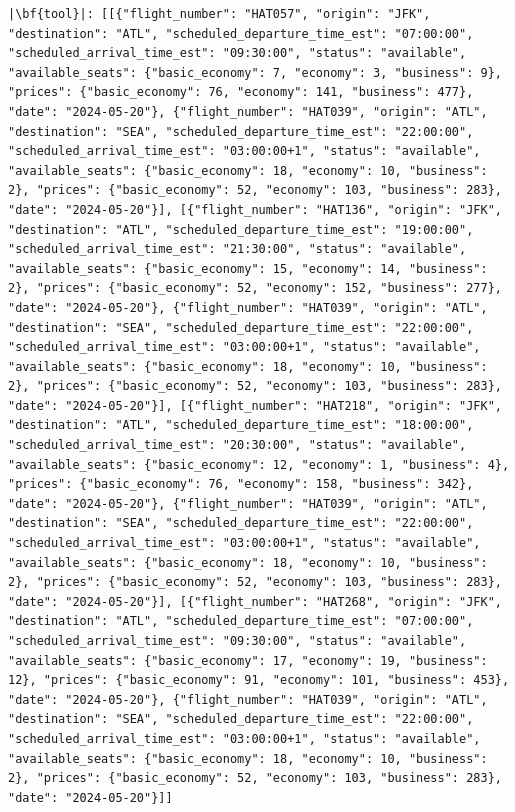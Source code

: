 \begin{verbatim}
|\bf{tool}|: [[{"flight_number": "HAT057", "origin": "JFK", "destination": "ATL", "scheduled_departure_time_est": "07:00:00", "scheduled_arrival_time_est": "09:30:00", "status": "available", "available_seats": {"basic_economy": 7, "economy": 3, "business": 9}, "prices": {"basic_economy": 76, "economy": 141, "business": 477}, "date": "2024-05-20"}, {"flight_number": "HAT039", "origin": "ATL", "destination": "SEA", "scheduled_departure_time_est": "22:00:00", "scheduled_arrival_time_est": "03:00:00+1", "status": "available", "available_seats": {"basic_economy": 18, "economy": 10, "business": 2}, "prices": {"basic_economy": 52, "economy": 103, "business": 283}, "date": "2024-05-20"}], [{"flight_number": "HAT136", "origin": "JFK", "destination": "ATL", "scheduled_departure_time_est": "19:00:00", "scheduled_arrival_time_est": "21:30:00", "status": "available", "available_seats": {"basic_economy": 15, "economy": 14, "business": 2}, "prices": {"basic_economy": 52, "economy": 152, "business": 277}, "date": "2024-05-20"}, {"flight_number": "HAT039", "origin": "ATL", "destination": "SEA", "scheduled_departure_time_est": "22:00:00", "scheduled_arrival_time_est": "03:00:00+1", "status": "available", "available_seats": {"basic_economy": 18, "economy": 10, "business": 2}, "prices": {"basic_economy": 52, "economy": 103, "business": 283}, "date": "2024-05-20"}], [{"flight_number": "HAT218", "origin": "JFK", "destination": "ATL", "scheduled_departure_time_est": "18:00:00", "scheduled_arrival_time_est": "20:30:00", "status": "available", "available_seats": {"basic_economy": 12, "economy": 1, "business": 4}, "prices": {"basic_economy": 76, "economy": 158, "business": 342}, "date": "2024-05-20"}, {"flight_number": "HAT039", "origin": "ATL", "destination": "SEA", "scheduled_departure_time_est": "22:00:00", "scheduled_arrival_time_est": "03:00:00+1", "status": "available", "available_seats": {"basic_economy": 18, "economy": 10, "business": 2}, "prices": {"basic_economy": 52, "economy": 103, "business": 283}, "date": "2024-05-20"}], [{"flight_number": "HAT268", "origin": "JFK", "destination": "ATL", "scheduled_departure_time_est": "07:00:00", "scheduled_arrival_time_est": "09:30:00", "status": "available", "available_seats": {"basic_economy": 17, "economy": 19, "business": 12}, "prices": {"basic_economy": 91, "economy": 101, "business": 453}, "date": "2024-05-20"}, {"flight_number": "HAT039", "origin": "ATL", "destination": "SEA", "scheduled_departure_time_est": "22:00:00", "scheduled_arrival_time_est": "03:00:00+1", "status": "available", "available_seats": {"basic_economy": 18, "economy": 10, "business": 2}, "prices": {"basic_economy": 52, "economy": 103, "business": 283}, "date": "2024-05-20"}]]



\end{verbatim}
